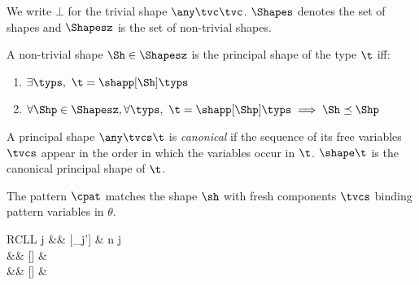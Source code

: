 \documentclass[acmsmall,screen,nonacm%
\Anonymous{,anonymous}{}%
\Final{}{,review}%
]{acmart}
\begin{document}
We write $\bot$ for the trivial shape $\any \tvc \tvc$. $\Shapes$ denotes the set of shapes and $\Shapesz$ is the set of non-trivial shapes.

\begin{definition}
A non-trivial shape $\Sh \in \Shapesz$ is the principal shape of the type
$\t$ iff:
\begin{enumerate}
  \item
    $\exists \typs,\ \t = \shapp[\Sh] \typs$
  \item
    $\forall \Shp \in \Shapesz, \forall \typs,\ \t = \shapp[\Shp] \typs
    \implies \Sh \preceq \Shp$
\end{enumerate}

A principal shape $\any \tvcs \t$ is \emph{canonical} if the sequence of its
free variables $\tvcs$ appear in the order in which the variables occur in
$\t$. $\shape \t$ is the canonical principal shape of $\t$.
\end{definition}

\begin{judgboxmathpar}
  {\cmatches \cpat \sh \tvcs \theta}
  {The pattern $\cpat$ matches the shape $\sh$ with fresh components $\tvcs$ binding\\pattern variables in $\theta$.}
  \\
  \newcommand{\Mrule}[5][]{{#2} \Matches {(#3)} \; #4 &\eqdef& {#5} & #1}
  \begin{tabular}{RCLL}
    \Mrule[ n \geq j]
      {\cpatprod \tv j}
      {\any \tvcs \Pi\iton \tvcs} \tvcps
      {[\tv \is \tvc_j']}
    \\[1ex]
    \Mrule
      {\cpatrcd \ct}
      {\any \tvcs \trcd \T \tvcs} \tvcps
      {[\ct \is \T]}
    \\[1ex]
    \Mrule
      {\cpatpoly \cscm}
      {\any \tvcs \tpoly \ts} \tvcps
      {[\cscm \is \ts \where{\tvcs \is \tvcps}]}
  \end{tabular}
\end{judgboxmathpar}
\end{document}
